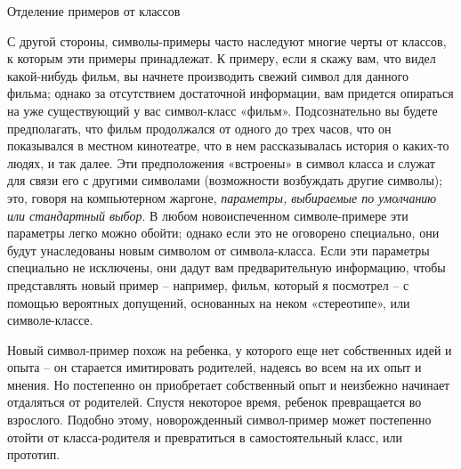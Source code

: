 \documentclass[../main.tex]{subfiles}
\begin{document}
Отделение примеров от классов

С другой стороны, символы-примеры часто наследуют многие черты от классов, к которым эти примеры принадлежат. К примеру, если я скажу вам, что видел какой-нибудь фильм, вы начнете производить свежий символ для данного фильма; однако за отсутствием достаточной информации, вам придется опираться на уже существующий у вас символ-класс «фильм». Подсознательно вы будете предполагать, что фильм продолжался от одного до трех часов, что он показывался в местном кинотеатре, что в нем рассказывалась история о каких-то людях, и так далее. Эти предположения «встроены» в символ класса и служат для связи его с другими символами (возможности возбуждать другие символы); это, говоря на компьютерном жаргоне, \emph{параметры, выбираемые по умолчанию или стандартный выбор}. В любом новоиспеченном символе-примере эти параметры легко можно обойти; однако если это не оговорено специально, они будут унаследованы новым символом от символа-класса. Если эти параметры специально не исключены, они дадут вам предварительную информацию, чтобы представлять новый пример \--- например, фильм, который я посмотрел \--- с помощью вероятных допущений, основанных на неком «стереотипе», или символе-классе.

Новый символ-пример похож на ребенка, у которого еще нет собственных идей и опыта \--- он старается имитировать родителей, надеясь во всем на их опыт и мнения. Но постепенно он приобретает собственный опыт и неизбежно начинает отдаляться от родителей. Спустя некоторое время, ребенок превращается во взрослого. Подобно этому, новорожденный символ-пример может постепенно отойти от класса-родителя и превратиться в самостоятельный класс, или прототип.
\end{document}
